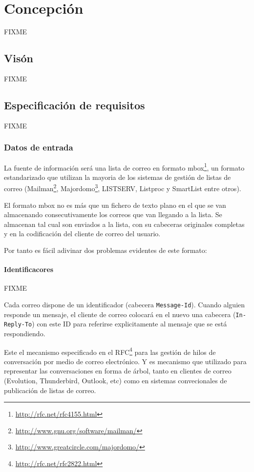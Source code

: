 
\section{Concepción}

FIXME

\subsection{Visón}

FIXME

\subsection{Especificación de requisitos}

FIXME

\subsubsection{Datos de entrada}

La fuente de información será una lista de correo en formato
mbox\footnote{\url{http://rfc.net/rfc4155.html}}, un formato estandarizado
que utilizan la mayoria de los sistemas de gestión de listas de correo
(Mailman\footnote{\url{http://www.gnu.org/software/mailman/}}, 
Majordomo\footnote{\url{http://www.greatcircle.com/majordomo/}},
LISTSERV, Listproc y SmartList entre otros).

El formato mbox no es más que un fichero de texto plano en el que se van
almacenando consecutivamente los correos que van llegando a la lista. Se 
almacenan tal cual son enviados a la lista, con su cabeceras originales 
completas y en la codificación del cliente de correo del usuario.

Por tanto es fácil adivinar dos problemas evidentes de este formato:

\paragraph{Identificacores}

FIXME

Cada correo dispone de un identificador (cabecera \texttt{Message-Id}). Cuando
alguien responde un mensaje, el cliente de correo colocará en el nuevo una 
cabecera (\texttt{In-Reply-To}) con este ID para referirse explicitamente al 
mensaje que se está respondiendo.

Este el mecanismo especificado en el RFC\footnote{\url{http://rfc.net/rfc2822.html}} 
para las gestión de hilos de conversación por medio de correo electrónico. Y es
mecanismo que utilizado para representar las conversaciones en forma de árbol, 
tanto en clientes de correo (Evolution, Thunderbird, Outlook, etc) como en sistemas 
convecionales de publicación de listas de correo.

